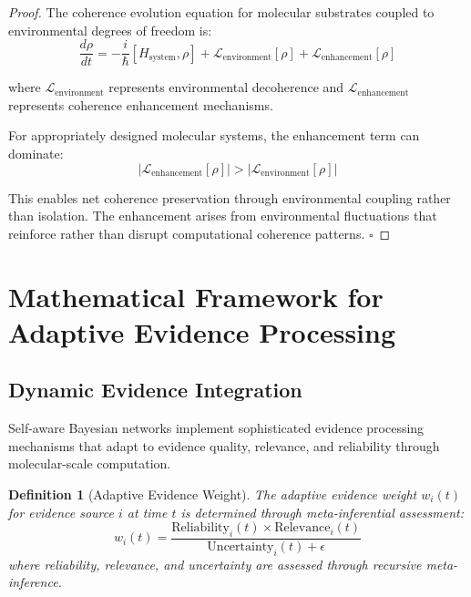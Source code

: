 \documentclass[12pt,a4paper]{article}
\newtheorem{definition}[theorem]{Definition}
\begin{document}
\begin{proof}
The coherence evolution equation for molecular substrates coupled to environmental degrees of freedom is:
\begin{equation}
\frac{d\rho}{dt} = -\frac{i}{\hbar}[H_{\text{system}}, \rho] + \mathcal{L}_{\text{environment}}[\rho] + \mathcal{L}_{\text{enhancement}}[\rho]
\end{equation}

where $\mathcal{L}_{\text{environment}}$ represents environmental decoherence and $\mathcal{L}_{\text{enhancement}}$ represents coherence enhancement mechanisms.

For appropriately designed molecular systems, the enhancement term can dominate:
\begin{equation}
|\mathcal{L}_{\text{enhancement}}[\rho]| > |\mathcal{L}_{\text{environment}}[\rho]|
\end{equation}

This enables net coherence preservation through environmental coupling rather than isolation. The enhancement arises from environmental fluctuations that reinforce rather than disrupt computational coherence patterns. $\square$
\end{proof}

\section{Mathematical Framework for Adaptive Evidence Processing}

\subsection{Dynamic Evidence Integration}

Self-aware Bayesian networks implement sophisticated evidence processing mechanisms that adapt to evidence quality, relevance, and reliability through molecular-scale computation.

\begin{definition}[Adaptive Evidence Weight]
The adaptive evidence weight $w_i(t)$ for evidence source $i$ at time $t$ is determined through meta-inferential assessment:
\begin{equation}
w_i(t) = \frac{\text{Reliability}_i(t) \times \text{Relevance}_i(t)}{\text{Uncertainty}_i(t) + \epsilon}
\end{equation}
where reliability, relevance, and uncertainty are assessed through recursive meta-inference.
\end{definition}
\end{document}
